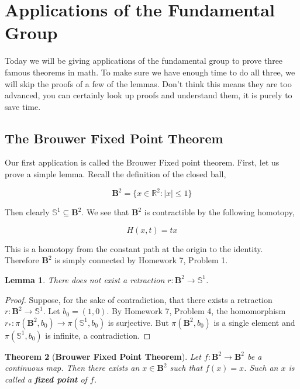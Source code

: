 \documentclass[a4paper]{article}
\newtheorem{theorem}{Theorem}
\newtheorem{lemma}[theorem]{Lemma}
\numberwithin{theorem}{section}
\begin{document}
\section{Applications of the Fundamental Group}

Today we will be giving applications of the fundamental group to prove three famous theorems in math. To make sure we have enough time to do all three, we will skip the proofs of a few of the lemmas. Don't think this means they are too advanced, you can certainly look up proofs and understand them, it is purely to save time.

\subsection{The Brouwer Fixed Point Theorem}

Our first application is called the Brouwer Fixed point theorem. First, let us prove a simple lemma. Recall the definition of the closed ball,

$$ \textbf{B}^2 = \{x \in \mathbb{R}^2 : |x| \leq 1\} $$

Then clearly $\mathbb{S}^1 \subseteq \textbf{B}^2$. We see that $\textbf{B}^2$ is contractible by the following homotopy,

$$ H(x,t) = tx $$

This is a homotopy from the constant path at the origin to the identity. Therefore $\textbf{B}^2$ is simply connected by Homework 7, Problem 1.

\begin{lemma}
There does not exist a retraction $r: \textbf{B}^2 \rightarrow \mathbb{S}^1$.
\end{lemma}

\begin{proof}
Suppose, for the sake of contradiction, that there exists a retraction $r: \textbf{B}^2 \rightarrow \mathbb{S}^1$. Let $b_0 = (1,0)$. By Homework 7, Problem 4, the homomorphism $r_*: \pi(\textbf{B}^2,b_0) \rightarrow \pi(\mathbb{S}^1,b_0)$ is surjective. But $\pi(\textbf{B}^2,b_0)$ is a single element and $\pi(\mathbb{S}^1,b_0)$ is infinite, a contradiction.
\end{proof}

\begin{theorem}[\textbf{Brouwer Fixed Point Theorem}]
Let $f: \textbf{B}^2 \rightarrow \textbf{B}^2$ be a continuous map. Then there exists an $x \in \textbf{B}^2$ such that $f(x) = x$. Such an $x$ is called a \textbf{fixed point} of $f$.
\end{theorem}
\end{document}
